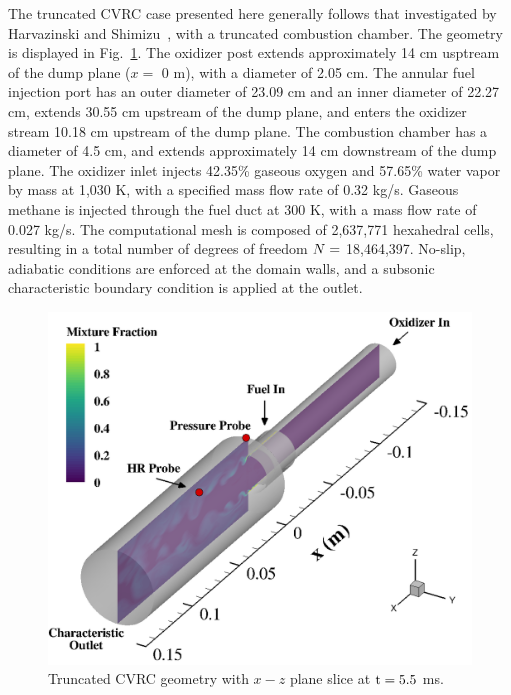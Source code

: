 The truncated CVRC case presented here generally follows that investigated by Harvazinski and Shimizu~\cite{HarvazinskiCVRCflamelet}, with a truncated combustion chamber. The geometry is displayed in Fig.~\ref{fig:cvrcGeom}. The oxidizer post extends approximately 14 cm usptream of the dump plane ($x = $ 0 m), with a diameter of 2.05 cm. The annular fuel injection port has an outer diameter of 23.09 cm and an inner diameter of 22.27 cm, extends 30.55 cm upstream of the dump plane, and enters the oxidizer stream 10.18 cm upstream of the dump plane. The combustion chamber has a diameter of 4.5 cm, and extends approximately 14 cm downstream of the dump plane. The oxidizer inlet injects 42.35\% gaseous oxygen and 57.65\% water vapor by mass at 1,030 K, with a specified mass flow rate of 0.32 kg/s. Gaseous methane is injected through the fuel duct at 300 K, with a mass flow rate of 0.027 kg/s. The computational mesh is composed of 2,637,771 hexahedral cells, resulting in a total number of degrees of freedom $N =$ 18,464,397. No-slip, adiabatic conditions are enforced at the domain walls, and a subsonic characteristic boundary condition is applied at the outlet.

\begin{figure}
	\centering
	\includegraphics[width=0.8\linewidth]{Chapters/HPROMResults/Images/cvrc/geom_hrProbe.png}
    \caption{\label{fig:cvrcGeom}
	Truncated CVRC geometry with $x-z$ plane slice at $\text{t} = 5.5$ ms.}
\end{figure}

